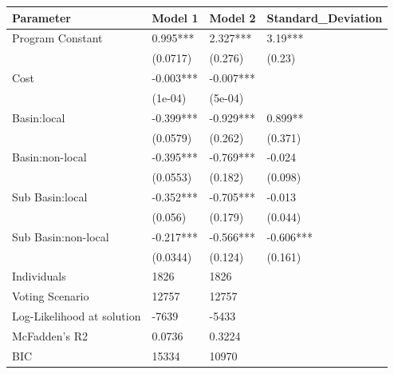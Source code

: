 \begin{table}[ht]
\centering
\begin{tabular}{llll}
  \hline
Parameter & Model 1 & Model 2 & Standard\_Deviation \\ 
  \hline
Program Constant & 0.995*** & 2.327*** & 3.19*** \\ 
   & (0.0717) & (0.276) & (0.23) \\ 
  Cost & -0.003*** & -0.007*** &  \\ 
   & (1e-04) & (5e-04) &  \\ 
  Basin:local & -0.399*** & -0.929*** & 0.899** \\ 
   & (0.0579) & (0.262) & (0.371) \\ 
  Basin:non-local & -0.395*** & -0.769*** & -0.024 \\ 
   & (0.0553) & (0.182) & (0.098) \\ 
  Sub Basin:local & -0.352*** & -0.705*** & -0.013 \\ 
   & (0.056) & (0.179) & (0.044) \\ 
  Sub Basin:non-local & -0.217*** & -0.566*** & -0.606*** \\ 
   & (0.0344) & (0.124) & (0.161) \\ 
  Individuals & 1826 & 1826 &  \\ 
  Voting Scenario & 12757 & 12757 &  \\ 
  Log-Likelihood at solution & -7639 & -5433 &  \\ 
  McFadden’s R2 & 0.0736 & 0.3224 &  \\ 
  BIC & 15334 & 10970 &  \\ 
   \hline
\end{tabular}
\end{table}

